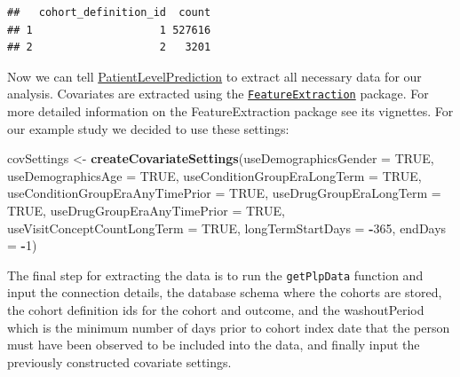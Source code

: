 \documentclass[11pt]{book}
\newenvironment{Shaded}{\begin{snugshade}}{\end{snugshade}}
\newcommand{\KeywordTok}[1]{\textcolor[rgb]{0.13,0.29,0.53}{\textbf{#1}}}
\newcommand{\DataTypeTok}[1]{\textcolor[rgb]{0.13,0.29,0.53}{#1}}
\newcommand{\DecValTok}[1]{\textcolor[rgb]{0.00,0.00,0.81}{#1}}
\newcommand{\StringTok}[1]{\textcolor[rgb]{0.31,0.60,0.02}{#1}}
\newcommand{\OtherTok}[1]{\textcolor[rgb]{0.56,0.35,0.01}{#1}}
\newcommand{\OperatorTok}[1]{\textcolor[rgb]{0.81,0.36,0.00}{\textbf{#1}}}
\newcommand{\NormalTok}[1]{#1}
\begin{document}
\begin{verbatim}
##   cohort_definition_id  count
## 1                    1 527616
## 2                    2   3201
\end{verbatim}

Now we can tell
\href{https://ohdsi.github.io/PatientLevelPrediction/}{PatientLevelPrediction}
to extract all necessary data for our analysis. Covariates are extracted
using the
\href{https://ohdsi.github.io/FeatureExtraction/}{\texttt{FeatureExtraction}}
package. For more detailed information on the FeatureExtraction package
see its vignettes. For our example study we decided to use these
settings:

\begin{Shaded}
\begin{Highlighting}[]
\NormalTok{covSettings <-}\StringTok{ }\KeywordTok{createCovariateSettings}\NormalTok{(}\DataTypeTok{useDemographicsGender =} \OtherTok{TRUE}\NormalTok{,}
                                       \DataTypeTok{useDemographicsAge =} \OtherTok{TRUE}\NormalTok{,}
                                       \DataTypeTok{useConditionGroupEraLongTerm =} \OtherTok{TRUE}\NormalTok{,}
                                       \DataTypeTok{useConditionGroupEraAnyTimePrior =} \OtherTok{TRUE}\NormalTok{,}
                                       \DataTypeTok{useDrugGroupEraLongTerm =} \OtherTok{TRUE}\NormalTok{,}
                                       \DataTypeTok{useDrugGroupEraAnyTimePrior =} \OtherTok{TRUE}\NormalTok{,}
                                       \DataTypeTok{useVisitConceptCountLongTerm =} \OtherTok{TRUE}\NormalTok{,}
                                       \DataTypeTok{longTermStartDays =} \OperatorTok{-}\DecValTok{365}\NormalTok{,}
                                       \DataTypeTok{endDays =} \OperatorTok{-}\DecValTok{1}\NormalTok{)}
\end{Highlighting}
\end{Shaded}

The final step for extracting the data is to run the \texttt{getPlpData}
function and input the connection details, the database schema where the
cohorts are stored, the cohort definition ids for the cohort and
outcome, and the washoutPeriod which is the minimum number of days prior
to cohort index date that the person must have been observed to be
included into the data, and finally input the previously constructed
covariate settings.
\end{document}
